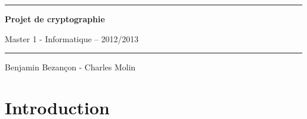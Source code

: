 \documentclass[12pt,a4paper]{report}
\begin{document}
\begin{titlepage}
	\begin{center}

	\vspace*{4cm}
	\hrule\bigskip
	
	{\LARGE\bf Projet de cryptographie}
	\bigskip

	{\normalsize Master 1 - Informatique -- 2012/2013}
	\bigskip
	\hrule
	\vspace*{2cm}

	\vspace*{5cm}

	Benjamin Bezançon - Charles Molin
	\end{center}
\end{titlepage}
	
	\newpage
	\chapter*{Introduction}
	
	\newpage
\end{document}
